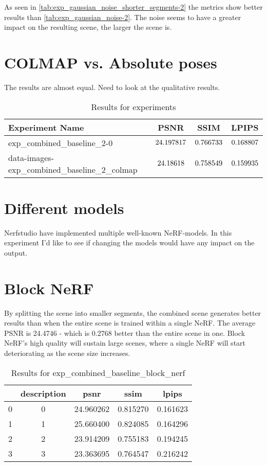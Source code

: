 As seen in \autoref{tab:exp_gaussian_noise_shorter_segments-2} the metrics show better results than \autoref{tab:exp_gaussian_noise-2}. The noise seems to have a greater impact on the resulting scene, the larger the scene is. 


\section{COLMAP vs. Absolute poses}

The results are almost equal. Need to look at the qualitative results.

\begin{table}[ht]
\centering
\caption{Results for experiments}
\label{tab:experiment_results}
\begin{tabular}{|l|c|c|c|}
\hline
\textbf{Experiment Name} & \textbf{PSNR} & \textbf{SSIM} & \textbf{LPIPS} \\ \hline
exp\_combined\_baseline\_2-0 & $\cellcolor{green} 24.197817$ & $\cellcolor{green} 0.766733$ & $\cellcolor{red} 0.168807$ \\ \hline
data-images-exp\_combined\_baseline\_2\_colmap & $\cellcolor{red} 24.18618$ & $\cellcolor{red} 0.758549$ & $\cellcolor{green} 0.159935$ \\ \hline
\end{tabular}
\end{table}

\section{Different models}
Nerfstudio have implemented multiple well-known NeRF-models. In this experiment I'd like to see if changing the models would have any impact on the output.



\section{Block NeRF}

By splitting the scene into smaller segments, the combined scene generates better results than when the entire scene is trained within a single NeRF. The average PSNR is 24.4746 - which is 0.2768 better than the entire scene in one. Block NeRF's high quality will sustain large scenes, where a single NeRF will start deteriorating as the scene size increases.

\begin{table}[ht]
\centering
\begin{tabular}{|l|c|c|c|c|}
\hline
& description & psnr & ssim & lpips \\
\hline
0 & 0 & 24.960262 & 0.815270 & 0.161623 \\
\cline{1-5}
1 & 1 & 25.660400 & 0.824085 & 0.164296 \\
\cline{1-5}
2 & 2 & 23.914209 & 0.755183 & 0.194245 \\
\cline{1-5}
3 & 3 & 23.363695 & 0.764547 & 0.216242 \\
\cline{1-5}
\hline
\end{tabular}
\caption{Results for exp\_combined\_baseline\_block\_nerf}
\label{tab:exp_combined_baseline_block_nerf}
\end{table}



